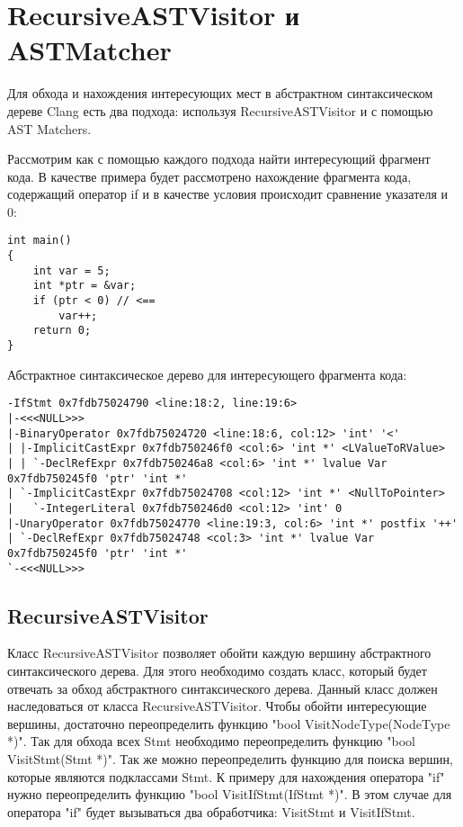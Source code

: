 \section{RecursiveASTVisitor и ASTMatcher}
Для обхода и нахождения интересующих мест в абстрактном синтаксическом дереве Clang есть два подхода:
используя RecursiveASTVisitor и с помощью AST Matchers.

Рассмотрим как с помощью каждого подхода найти интересующий фрагмент кода. В качестве примера
будет рассмотрено нахождение фрагмента кода, содержащий оператор if и в качестве условия 
происходит сравнение указателя и 0:
\begin{lstlisting}
int main()
{
	int var = 5;
	int *ptr = &var;
	if (ptr < 0) // <==
		var++;
	return 0;
}
\end{lstlisting}

Абстрактное синтаксическое дерево для интересующего фрагмента кода:
\begin{lstlisting}[basicstyle=\tiny]
-IfStmt 0x7fdb75024790 <line:18:2, line:19:6>
|-<<<NULL>>>
|-BinaryOperator 0x7fdb75024720 <line:18:6, col:12> 'int' '<'
| |-ImplicitCastExpr 0x7fdb750246f0 <col:6> 'int *' <LValueToRValue>
| | `-DeclRefExpr 0x7fdb750246a8 <col:6> 'int *' lvalue Var 0x7fdb750245f0 'ptr' 'int *'
| `-ImplicitCastExpr 0x7fdb75024708 <col:12> 'int *' <NullToPointer>
|   `-IntegerLiteral 0x7fdb750246d0 <col:12> 'int' 0
|-UnaryOperator 0x7fdb75024770 <line:19:3, col:6> 'int *' postfix '++'
| `-DeclRefExpr 0x7fdb75024748 <col:3> 'int *' lvalue Var 0x7fdb750245f0 'ptr' 'int *'
`-<<<NULL>>>
\end{lstlisting}

\subsection*{RecursiveASTVisitor}
Класс RecursiveASTVisitor позволяет обойти каждую вершину абстрактного синтаксического дерева.
Для этого необходимо создать класс, который будет отвечать за обход абстрактного синтаксического 
дерева. Данный класс должен наследоваться от класса RecursiveASTVisitor. Чтобы обойти интересующие вершины,
достаточно переопределить функцию "bool VisitNodeType(NodeType *)". Так для обхода всех Stmt 
необходимо переопределить функцию "bool VisitStmt(Stmt *)". Так же можно переопределить функцию
для поиска вершин, которые являются подклассами Stmt. К примеру для нахождения оператора "if"
нужно переопределить функцию "bool VisitIfStmt(IfStmt *)". В этом случае для оператора "if" 
будет вызываться два обработчика: VisitStmt и VisitIfStmt.


